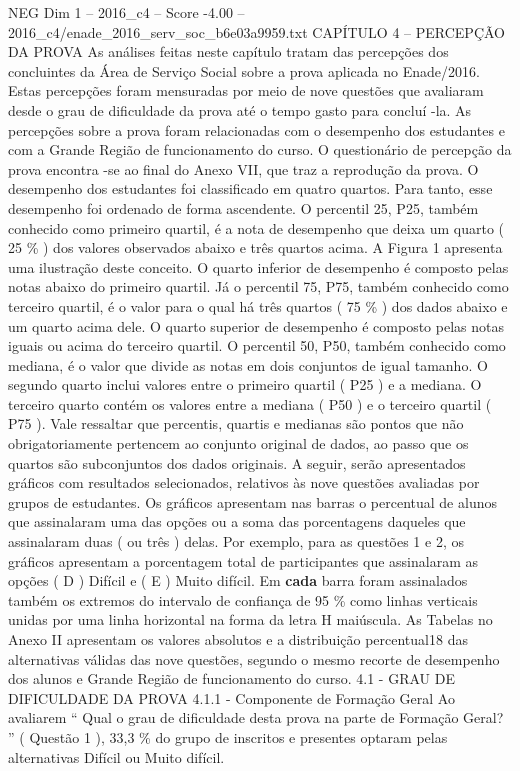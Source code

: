 \begin{textsample}{NEG Dim 1 – 2016\_c4 – Score -4.00 – 2016\_c4/enade\_2016\_serv\_soc\_b6e03a9959.txt}  \label{ex:f1_neg_155}
CAPÍTULO 4 – PERCEPÇÃO DA PROVA As análises feitas neste capítulo tratam das percepções dos concluintes da Área de Serviço Social sobre a prova aplicada no Enade/2016.
Estas percepções foram mensuradas por meio de nove questões que avaliaram desde o grau de dificuldade da prova até o tempo gasto para concluí -la.
As percepções sobre a prova foram relacionadas com o desempenho dos estudantes e com a Grande Região de funcionamento do curso.
O questionário de percepção da prova encontra -se ao final do Anexo VII, que traz a reprodução da prova.
O desempenho dos estudantes foi classificado em quatro quartos.
Para tanto, esse desempenho foi ordenado de forma ascendente.
O percentil 25, P25, também conhecido como primeiro quartil, é a nota de desempenho que deixa um quarto ( 25 \% ) dos valores observados abaixo e três quartos acima.
A Figura 1 apresenta uma ilustração deste conceito.
O quarto inferior de desempenho é composto pelas notas abaixo do primeiro quartil.
Já o percentil 75, P75, também conhecido como terceiro quartil, é o valor para o qual há três quartos ( 75 \% ) dos dados abaixo e um quarto acima dele.
O quarto superior de desempenho é composto pelas notas iguais ou acima do terceiro quartil.
O percentil 50, P50, também conhecido como mediana, é o valor que divide as notas em dois conjuntos de igual tamanho.
O segundo quarto inclui valores entre o primeiro quartil ( P25 ) e a mediana.
O terceiro quarto contém os valores entre a mediana ( P50 ) e o terceiro quartil ( P75 ).
Vale ressaltar que percentis, quartis e medianas são pontos que não obrigatoriamente pertencem ao conjunto original de dados, ao passo que os quartos são subconjuntos dos dados originais.
A seguir, serão apresentados gráficos com resultados selecionados, relativos às nove questões avaliadas por grupos de estudantes.
Os gráficos apresentam nas barras o percentual de alunos que assinalaram uma das opções ou a soma das porcentagens daqueles que assinalaram duas ( ou três ) delas.
Por exemplo, para as questões 1 e 2, os gráficos apresentam a porcentagem total de participantes que assinalaram as opções ( D ) Difícil e ( E ) Muito difícil.
Em \textbf{cada} barra foram assinalados também os extremos do intervalo de confiança de 95 \% como linhas verticais unidas por uma linha horizontal na forma da letra H maiúscula.
As Tabelas no Anexo II apresentam os valores absolutos e a distribuição percentual18 das alternativas válidas das nove questões, segundo o mesmo recorte de desempenho dos alunos e Grande Região de funcionamento do curso. 4.1 - GRAU DE DIFICULDADE DA PROVA 4.1.1 - Componente de Formação Geral Ao avaliarem “ Qual o grau de dificuldade desta prova na parte de Formação Geral? ” ( Questão 1 ), 33,3 \% do grupo de inscritos e presentes optaram pelas alternativas Difícil ou Muito difícil.

\end{textsample}
